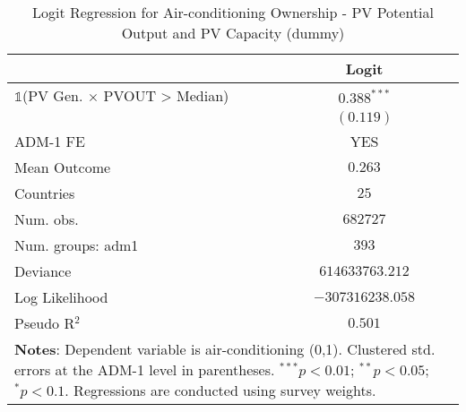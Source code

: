 
\begin{table}[H]
\caption{Logit Regression for Air-conditioning Ownership - PV Potential Output and PV Capacity (dummy)}
\begin{center}
\begin{tabular}{l c}
\hline
 & Logit \\
\hline
$\mathds{1}$(PV Gen. $\times$ PVOUT > Median) & $0.388^{***}$    \\
                                              & $(0.119)$        \\
\hline
ADM-1 FE                                      & YES              \\
Mean Outcome                                  & $0.263$          \\
Countries                                     & $25$             \\
Num. obs.                                     & $682727$         \\
Num. groups: adm1                             & $393$            \\
Deviance                                      & $614633763.212$  \\
Log Likelihood                                & $-307316238.058$ \\
Pseudo R$^2$                                  & $0.501$          \\
\hline
\multicolumn{2}{l}{\scriptsize{\textbf{Notes}: Dependent variable is air-conditioning (0,1). Clustered std. errors at the ADM-1 level in parentheses. $^{***}p<0.01$; $^{**}p<0.05$; $^{*}p<0.1$. Regressions are conducted using survey weights.}}
\end{tabular}
\label{main: tableA14_2}
\end{center}
\end{table}
